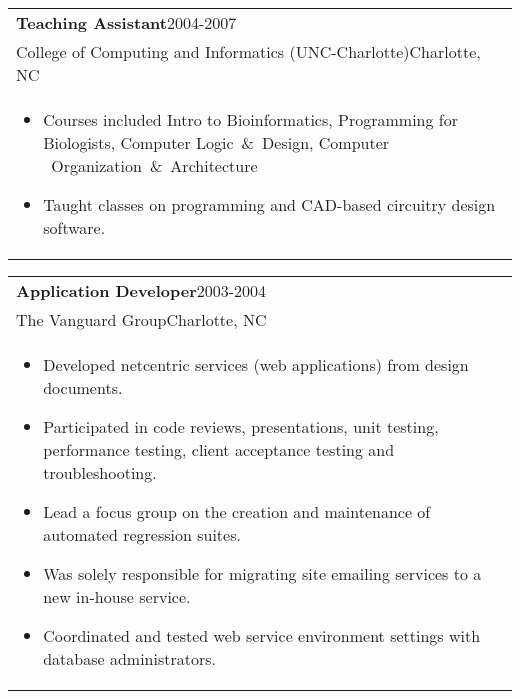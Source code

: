 \documentclass[12pt]{report}
\def\fullLength{6.5in}
\begin{document}
\vspace{-10.0mm}

\begin{table}[!ht]
\begin{tabular}{p{\fullLength}}
\textbf{Teaching Assistant}\hfill 2004-2007\\
College of Computing and Informatics (UNC-Charlotte)\hfill Charlotte, NC\\
\vspace{-7.0mm}
\begin{itemize}\addtolength{\itemsep}{-0.5\baselineskip}
\item Courses included Intro to Bioinformatics, Programming for Biologists, Computer Logic~\&~Design, Computer	~Organization~\&~Architecture
\item Taught classes on programming and CAD-based circuitry design software.
\end{itemize}
\end{tabular}
\end{table}

\clearpage

\begin{table}[!ht]
\begin{tabular}{p{\fullLength}}
\textbf{Application Developer}\hfill 2003-2004\\
The Vanguard Group\hfill Charlotte, NC\\
\vspace{-7.0mm}
\begin{itemize}\addtolength{\itemsep}{-0.5\baselineskip}
\item Developed netcentric services (web applications) from design documents.
\item Participated in code reviews, presentations, unit testing, performance testing, client acceptance testing and troubleshooting.
\item Lead a focus group on the creation and maintenance of automated regression suites.
\item Was solely responsible for migrating site emailing services to a new in-house service.
\item Coordinated and tested web service environment settings with database administrators.
\end{itemize}
\end{tabular}
\end{table}

\vspace{-10.0mm}
\end{document}
